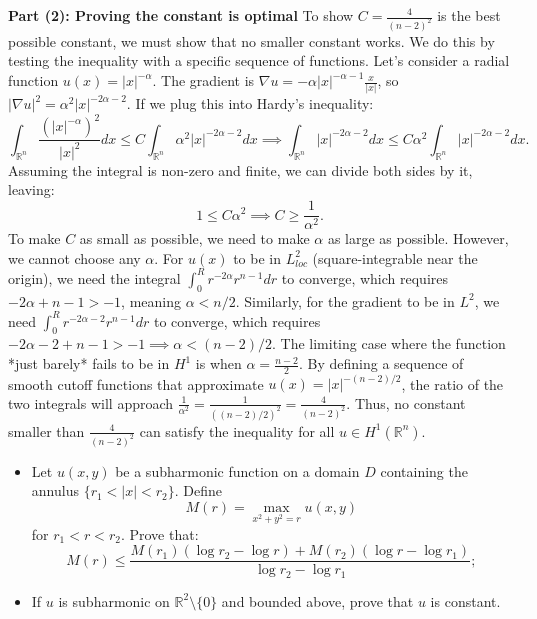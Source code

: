\begin{solution}
\textbf{Part (2): Proving the constant is optimal}
To show $C = \frac{4}{(n-2)^2}$ is the best possible constant, we must show that no smaller constant works. We do this by testing the inequality with a specific sequence of functions.
Let's consider a radial function $u(x) = |x|^{-\alpha}$. The gradient is $\nabla u = -\alpha |x|^{-\alpha - 1} \frac{x}{|x|}$, so $|\nabla u|^2 = \alpha^2 |x|^{-2\alpha - 2}$.
If we plug this into Hardy's inequality:
\[
\int_{\mathbb{R}^n} \frac{(|x|^{-\alpha})^2}{|x|^2} dx \leq C \int_{\mathbb{R}^n} \alpha^2 |x|^{-2\alpha - 2} dx \implies \int_{\mathbb{R}^n} |x|^{-2\alpha - 2} dx \leq C \alpha^2 \int_{\mathbb{R}^n} |x|^{-2\alpha - 2} dx.
\]
Assuming the integral is non-zero and finite, we can divide both sides by it, leaving:
\[
1 \leq C \alpha^2 \implies C \geq \frac{1}{\alpha^2}.
\]
To make $C$ as small as possible, we need to make $\alpha$ as large as possible. However, we cannot choose any $\alpha$. For $u(x)$ to be in $L^2_{loc}$ (square-integrable near the origin), we need the integral $\int_0^R r^{-2\alpha} r^{n-1} dr$ to converge, which requires $-2\alpha + n - 1 > -1$, meaning $\alpha < n/2$.
Similarly, for the gradient to be in $L^2$, we need $\int_0^R r^{-2\alpha-2} r^{n-1} dr$ to converge, which requires $-2\alpha - 2 + n - 1 > -1 \implies \alpha < (n-2)/2$.
The limiting case where the function *just barely* fails to be in $H^1$ is when $\alpha = \frac{n-2}{2}$.
By defining a sequence of smooth cutoff functions that approximate $u(x) = |x|^{-(n-2)/2}$, the ratio of the two integrals will approach $\frac{1}{\alpha^2} = \frac{1}{((n-2)/2)^2} = \frac{4}{(n-2)^2}$.
Thus, no constant smaller than $\frac{4}{(n-2)^2}$ can satisfy the inequality for all $u \in H^1(\mathbb{R}^n)$.
\end{solution}

\begin{exercise}
\label{analysis:2025:3}
\begin{itemize}
\item[(1)] Let $u(x,y)$ be a subharmonic function on a domain $D$ containing the annulus $\{r_1<|x|<r_2\}$. Define
\[
M(r) = \max_{x^2+y^2=r} u(x,y)
\]
for $r_1<r<r_2$. Prove that:
\[
M(r) \leq \frac{M(r_1)(\log r_2 - \log r) + M(r_2)(\log r - \log r_1)}{\log r_2 - \log r_1};
\]
\item[(2)] If $u$ is subharmonic on $\mathbb{R}^2\setminus\{0\}$ and bounded above, prove that $u$ is constant.
\end{itemize}
\end{exercise}

